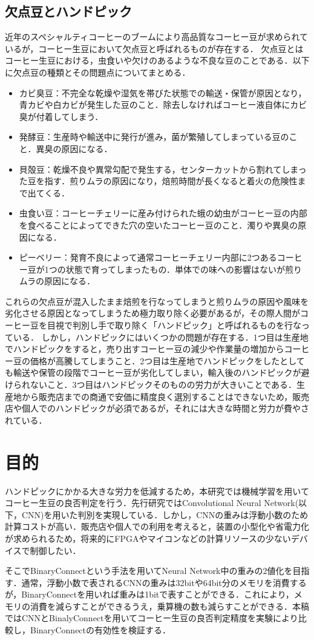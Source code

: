 \subsection{欠点豆とハンドピック}
近年のスペシャルティコーヒーのブームにより高品質なコーヒー豆が求められているが，コーヒー生豆において欠点豆と呼ばれるものが存在する．
欠点豆とはコーヒー生豆における，虫食いや欠けのあるような不良な豆のことである．以下に欠点豆の種類とその問題点についてまとめる\cite{coffeetaizenn}．
\begin{itemize}
  \item カビ臭豆：不完全な乾燥や湿気を帯びた状態での輸送・保管が原因となり，青カビや白カビが発生した豆のこと．除去しなければコーヒー液自体にカビ臭が付着してしまう．
  \item 発酵豆：生産時や輸送中に発行が進み，菌が繁殖してしまっている豆のこと．異臭の原因になる．
  \item 貝殻豆：乾燥不良や異常勾配で発生する，センターカットから割れてしまった豆を指す．煎りムラの原因になり，焙煎時間が長くなると着火の危険性まで出てくる．
  \item 虫食い豆：コーヒーチェリーに産み付けられた蛾の幼虫がコーヒー豆の内部を食べることによってできた穴の空いたコーヒー豆のこと．濁りや異臭の原因になる．
  \item ピーベリー：発育不良によって通常コーヒーチェリー内部に2つあるコーヒー豆が1つの状態で育ってしまったもの．単体での味への影響はないが煎りムラの原因になる．
\end{itemize}
これらの欠点豆が混入したまま焙煎を行なってしまうと煎りムラの原因や風味を劣化させる原因となってしまうため極力取り除く必要があるが，その際人間がコーヒー豆を目視で判別し手で取り除く「ハンドピック」と呼ばれるものを行なっている．
しかし，ハンドピックにはいくつかの問題が存在する．1つ目は生産地でハンドピックをすると，売り出すコーヒー豆の減少や作業量の増加からコーヒー豆の価格が高騰してしまうこと．2つ目は生産地でハンドピックをしたとしても輸送や保管の段階でコーヒー豆が劣化してしまい，輸入後のハンドピックが避けられないこと．3つ目はハンドピックそのものの労力が大きいことである．生産地から販売店までの商通で安価に精度良く選別することはできないため，販売店や個人でのハンドピックが必須であるが，それには大きな時間と労力が費やされている．

\section{目的}
ハンドピックにかかる大きな労力を低減するため，本研究では機械学習を用いてコーヒー生豆の良否判定を行う．先行研究ではConvolutional Neural Network(以下，CNN)を用いた判別を実現している．しかし，CNNの重みは浮動小数のため計算コストが高い．販売店や個人での利用を考えると，装置の小型化や省電力化が求められるため，将来的にFPGAやマイコンなどの計算リソースの少ないデバイスで制御したい．

そこでBinaryConnectという手法を用いてNeural Network中の重みの2値化を目指す．通常，浮動小数で表されるCNNの重みは32bitや64bit分のメモリを消費するが，BinaryConnectを用いれば重みは1bitで表すことができる．これにより，メモリの消費を減らすことができるうえ，乗算機の数も減らすことができる．本稿ではCNNとBinalyConnectを用いてコーヒー生豆の良否判定精度を実験により比較し，BinaryConnectの有効性を検証する．
